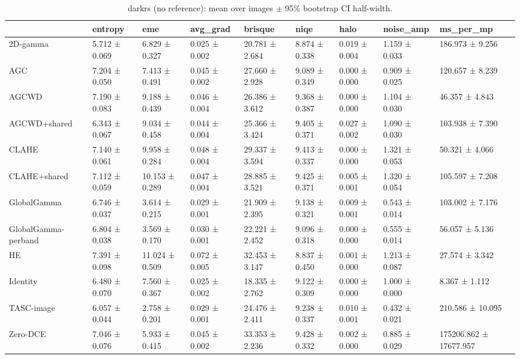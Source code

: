 \begin{table}[t]
\caption{darkrs (no reference): mean over images $\pm$ 95\% bootstrap CI half-width.}
\label{tab:darkrs_summary}
\begin{tabular}{lllllllll}
\toprule
 & entropy & eme & avg\_grad & brisque & niqe & halo & noise\_amp & ms\_per\_mp \\
\midrule
2D-gamma & 5.712 ± 0.069 & 6.829 ± 0.327 & 0.025 ± 0.002 & 20.781 ± 2.684 & 8.874 ± 0.338 & 0.019 ± 0.004 & 1.159 ± 0.033 & 186.973 ± 9.256 \\
AGC & 7.204 ± 0.050 & 7.413 ± 0.491 & 0.045 ± 0.002 & 27.660 ± 2.928 & 9.089 ± 0.349 & 0.000 ± 0.000 & 0.909 ± 0.025 & 120.657 ± 8.239 \\
AGCWD & 7.190 ± 0.083 & 9.188 ± 0.439 & 0.046 ± 0.004 & 26.386 ± 3.612 & 9.368 ± 0.387 & 0.000 ± 0.000 & 1.104 ± 0.030 & 46.357 ± 4.843 \\
AGCWD+shared & 6.343 ± 0.067 & 9.034 ± 0.458 & 0.044 ± 0.004 & 25.366 ± 3.424 & 9.405 ± 0.371 & 0.027 ± 0.002 & 1.090 ± 0.030 & 103.938 ± 7.390 \\
CLAHE & 7.140 ± 0.061 & 9.958 ± 0.284 & 0.048 ± 0.004 & 29.337 ± 3.594 & 9.413 ± 0.337 & 0.000 ± 0.000 & 1.321 ± 0.053 & 50.321 ± 4.066 \\
CLAHE+shared & 7.112 ± 0.059 & 10.153 ± 0.289 & 0.047 ± 0.004 & 28.885 ± 3.521 & 9.425 ± 0.371 & 0.005 ± 0.001 & 1.320 ± 0.054 & 105.597 ± 7.208 \\
GlobalGamma & 6.746 ± 0.037 & 3.614 ± 0.215 & 0.029 ± 0.001 & 21.909 ± 2.395 & 9.138 ± 0.321 & 0.009 ± 0.001 & 0.543 ± 0.014 & 103.002 ± 7.176 \\
GlobalGamma-perband & 6.804 ± 0.038 & 3.569 ± 0.170 & 0.030 ± 0.001 & 22.221 ± 2.452 & 9.096 ± 0.318 & 0.000 ± 0.000 & 0.555 ± 0.014 & 56.057 ± 5.136 \\
HE & 7.391 ± 0.098 & 11.024 ± 0.509 & 0.072 ± 0.005 & 32.453 ± 3.147 & 8.837 ± 0.450 & 0.001 ± 0.000 & 1.213 ± 0.087 & 27.574 ± 3.342 \\
Identity & 6.480 ± 0.070 & 7.560 ± 0.367 & 0.025 ± 0.002 & 18.335 ± 2.762 & 9.122 ± 0.309 & 0.000 ± 0.000 & 1.000 ± 0.000 & 8.367 ± 1.112 \\
TASC-image & 6.057 ± 0.044 & 2.758 ± 0.201 & 0.029 ± 0.001 & 24.476 ± 2.411 & 9.238 ± 0.337 & 0.010 ± 0.001 & 0.432 ± 0.021 & 210.586 ± 10.095 \\
Zero-DCE & 7.046 ± 0.076 & 5.933 ± 0.415 & 0.045 ± 0.002 & 33.353 ± 2.236 & 9.428 ± 0.332 & 0.002 ± 0.000 & 0.885 ± 0.029 & 175206.862 ± 17677.957 \\
\bottomrule
\end{tabular}
\end{table}
